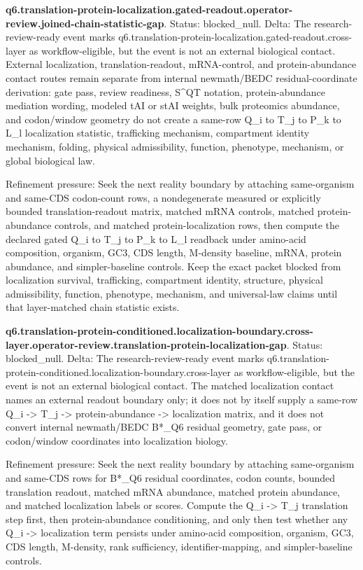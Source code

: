 \textbf{q6.translation-protein-localization.gated-readout.operator-review.joined-chain-statistic-gap}. Status: blocked\_null. Delta: The research-review-ready event marks q6.translation-protein-localization.gated-readout.cross-layer as workflow-eligible, but the event is not an external biological contact. External localization, translation-readout, mRNA-control, and protein-abundance contact routes remain separate from internal newmath/BEDC residual-coordinate derivation: gate pass, review readiness, S\textasciicircum{}QT notation, protein-abundance mediation wording, modeled tAI or stAI weights, bulk proteomics abundance, and codon/window geometry do not create a same-row Q\_i to T\_j to P\_k to L\_l localization statistic, trafficking mechanism, compartment identity mechanism, folding, physical admissibility, function, phenotype, mechanism, or global biological law.

Refinement pressure: Seek the next reality boundary by attaching same-organism and same-CDS codon-count rows, a nondegenerate measured or explicitly bounded translation-readout matrix, matched mRNA controls, matched protein-abundance controls, and matched protein-localization rows, then compute the declared gated Q\_i to T\_j to P\_k to L\_l readback under amino-acid composition, organism, GC3, CDS length, M-density baseline, mRNA, protein abundance, and simpler-baseline controls. Keep the exact packet blocked from localization survival, trafficking, compartment identity, structure, physical admissibility, function, phenotype, mechanism, and universal-law claims until that layer-matched chain statistic exists.

\textbf{q6.translation-protein-conditioned.localization-boundary.cross-layer.operator-review.translation-protein-localization-gap}. Status: blocked\_null. Delta: The research-review-ready event marks q6.translation-protein-conditioned.localization-boundary.cross-layer as workflow-eligible, but the event is not an external biological contact. The matched localization contact names an external readout boundary only; it does not by itself supply a same-row Q\_i -> T\_j -> protein-abundance -> localization matrix, and it does not convert internal newmath/BEDC B*\_Q6 residual geometry, gate pass, or codon/window coordinates into localization biology.

Refinement pressure: Seek the next reality boundary by attaching same-organism and same-CDS rows for B*\_Q6 residual coordinates, codon counts, bounded translation readout, matched mRNA abundance, matched protein abundance, and matched localization labels or scores. Compute the Q\_i -> T\_j translation step first, then protein-abundance conditioning, and only then test whether any Q\_i -> localization term persists under amino-acid composition, organism, GC3, CDS length, M-density, rank sufficiency, identifier-mapping, and simpler-baseline controls.

